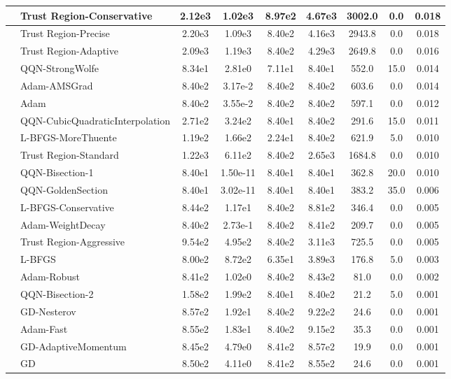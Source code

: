 \documentclass[10pt]{article}
\begin{document}
\begin{longtable}{|l|l|c|c|c|c|c|c|c|}
\hline
 & Trust Region-Conservative & 2.12e3 & 1.02e3 & 8.97e2 & 4.67e3 & 3002.0 & 0.0 & 0.018 \\
\hline
 & Trust Region-Precise & 2.20e3 & 1.09e3 & 8.40e2 & 4.16e3 & 2943.8 & 0.0 & 0.018 \\
\hline
 & Trust Region-Adaptive & 2.09e3 & 1.19e3 & 8.40e2 & 4.29e3 & 2649.8 & 0.0 & 0.016 \\
\hline
 & QQN-StrongWolfe & 8.34e1 & 2.81e0 & 7.11e1 & 8.40e1 & 552.0 & 15.0 & 0.014 \\
\hline
 & Adam-AMSGrad & 8.40e2 & 3.17e-2 & 8.40e2 & 8.40e2 & 603.6 & 0.0 & 0.014 \\
\hline
 & Adam & 8.40e2 & 3.55e-2 & 8.40e2 & 8.40e2 & 597.1 & 0.0 & 0.012 \\
\hline
 & QQN-CubicQuadraticInterpolation & 2.71e2 & 3.24e2 & 8.40e1 & 8.40e2 & 291.6 & 15.0 & 0.011 \\
\hline
 & L-BFGS-MoreThuente & 1.19e2 & 1.66e2 & 2.24e1 & 8.40e2 & 621.9 & 5.0 & 0.010 \\
\hline
 & Trust Region-Standard & 1.22e3 & 6.11e2 & 8.40e2 & 2.65e3 & 1684.8 & 0.0 & 0.010 \\
\hline
 & QQN-Bisection-1 & 8.40e1 & 1.50e-11 & 8.40e1 & 8.40e1 & 362.8 & 20.0 & 0.010 \\
\hline
 & QQN-GoldenSection & 8.40e1 & 3.02e-11 & 8.40e1 & 8.40e1 & 383.2 & 35.0 & 0.006 \\
\hline
 & L-BFGS-Conservative & 8.44e2 & 1.17e1 & 8.40e2 & 8.81e2 & 346.4 & 0.0 & 0.005 \\
\hline
 & Adam-WeightDecay & 8.40e2 & 2.73e-1 & 8.40e2 & 8.41e2 & 209.7 & 0.0 & 0.005 \\
\hline
 & Trust Region-Aggressive & 9.54e2 & 4.95e2 & 8.40e2 & 3.11e3 & 725.5 & 0.0 & 0.005 \\
\hline
 & L-BFGS & 8.00e2 & 8.72e2 & 6.35e1 & 3.89e3 & 176.8 & 5.0 & 0.003 \\
\hline
 & Adam-Robust & 8.41e2 & 1.02e0 & 8.40e2 & 8.43e2 & 81.0 & 0.0 & 0.002 \\
\hline
 & QQN-Bisection-2 & 1.58e2 & 1.99e2 & 8.40e1 & 8.40e2 & 21.2 & 5.0 & 0.001 \\
\hline
 & GD-Nesterov & 8.57e2 & 1.92e1 & 8.40e2 & 9.22e2 & 24.6 & 0.0 & 0.001 \\
\hline
 & Adam-Fast & 8.55e2 & 1.83e1 & 8.40e2 & 9.15e2 & 35.3 & 0.0 & 0.001 \\
\hline
 & GD-AdaptiveMomentum & 8.45e2 & 4.79e0 & 8.41e2 & 8.57e2 & 19.9 & 0.0 & 0.001 \\
\hline
 & GD & 8.50e2 & 4.11e0 & 8.41e2 & 8.55e2 & 24.6 & 0.0 & 0.001 \\

\end{longtable}
\end{document}
